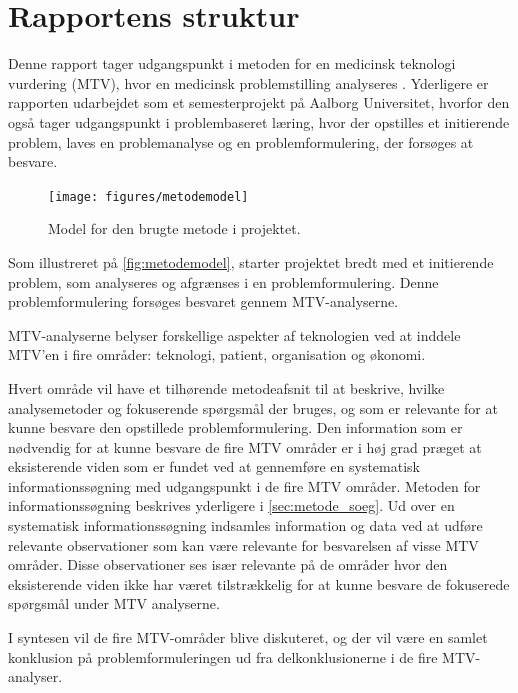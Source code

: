 \chapter{Rapportens struktur} \label{metode}
Denne rapport tager udgangspunkt i metoden for en medicinsk teknologi vurdering (MTV), hvor en medicinsk problemstilling analyseres \citep{mtvhaandbog}. Yderligere er rapporten udarbejdet som et semesterprojekt på Aalborg Universitet, hvorfor den også tager udgangspunkt i problembaseret læring, hvor der opstilles et initierende problem, laves en problemanalyse og en problemformulering, der forsøges at besvare. 


\begin{figure}[H]
	\centering
	\texttt{[image: figures/metodemodel]}
	\caption{Model for den brugte metode i projektet.}
	\label{fig:metodemodel}
\end{figure}

\noindent
Som illustreret på \autoref{fig:metodemodel}, starter projektet bredt med et initierende problem, som analyseres og afgrænses i en problemformulering. Denne problemformulering forsøges besvaret gennem MTV-analyserne. 

MTV-analyserne belyser forskellige aspekter af teknologien ved at inddele MTV'en i fire områder: teknologi, patient, organisation og økonomi. %

Hvert område vil have et tilhørende metodeafsnit til at beskrive, hvilke analysemetoder og fokuserende spørgsmål der bruges, og som er relevante for at kunne besvare den opstillede problemformulering. Den information som er nødvendig for at kunne besvare de fire MTV områder er i høj grad præget at eksisterende viden som er fundet ved at gennemføre en systematisk informationssøgning med udgangspunkt i de fire MTV områder. Metoden for informationssøgning beskrives yderligere i \autoref{sec:metode_soeg}. Ud over en systematisk informationssøgning indsamles information og data ved at udføre relevante observationer som kan være relevante for besvarelsen af visse MTV områder. Disse observationer ses især relevante på de områder hvor den eksisterende viden ikke har været tilstrækkelig for at kunne besvare de fokuserede spørgsmål under MTV analyserne.

I syntesen vil de fire MTV-områder blive diskuteret, og der vil være en samlet konklusion på problemformuleringen ud fra delkonklusionerne i de fire MTV-analyser. 

